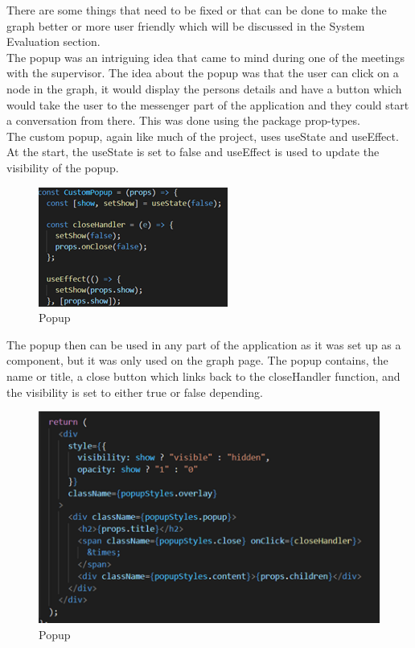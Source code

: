 There are some things that need to be fixed or that can be done to make the graph better or more user friendly which will be discussed in the System Evaluation section. \\

The popup was an intriguing idea that came to mind during one of the meetings with the supervisor. The idea about the popup was that the user can click on a node in the graph, it would display the persons details and have a button which would take the user to the messenger part of the application and they could start a conversation from there. This was done using the package prop-types. \\

The custom popup, again like much of the project, uses useState and useEffect. At the start, the useState is set to false and useEffect is used to update the visibility of the popup.\\
\begin{figure}[H]
    \centering
    \includegraphics{img/Graph8.png}
    \caption{Popup} 
    \label{fig:my_label}
\end{figure}

The popup then can be used in any part of the application as it was set up as a component, but it was only used on the graph page. The popup contains, the name or title, a close button which links back to the closeHandler function, and the visibility is set to either true or false depending.\\
\begin{figure}[H]
    \centering
    \includegraphics{img/Graph9.png}
    \caption{Popup} 
    \label{fig:my_label}
\end{figure}

